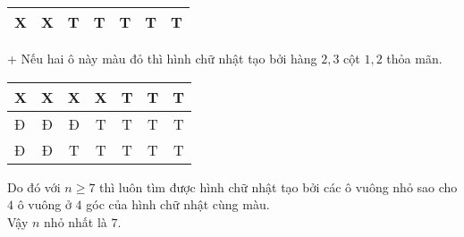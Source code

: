 {\begin{itemize}
\begin{center}
\begin{tabular}{|l|c|c|c|c|c|c|}
		\hline 
		\color{blue}X&  \color{blue}X & \color{white}T & \color{white}T & \color{white}T & \color{white}T & \color{white}T\\
		\hline
	\end{tabular}
	\end{center}
	+ Nếu hai ô này màu đỏ thì hình chữ nhật tạo bởi hàng $2, 3$ cột $1, 2$ thỏa mãn.
	\begin{center}
		\begin{tabular}{|l|c|c|c|c|c|c|}
		\hline 
		\color{blue}X& \color{blue}X & \color{blue}X & \color{blue}X & \color{white}T & \color{white}T & \color{white}T \\ 
		\hline 
		\color{red}Đ & 	\color{red}Đ & 	\color{red}Đ & \color{white}T & \color{white}T & \color{white}T & \color{white}T\\ 
		\hline 
		\color{red}Đ&  \color{red}Đ & \color{white}T & \color{white}T & \color{white}T & \color{white}T & \color{white}T\\
		\hline	
	\end{tabular}
	\end{center}
	\end{itemize}
	Do đó với $n \geq 7$ thì luôn tìm được hình chữ nhật tạo bởi các ô vuông nhỏ sao cho $4$ ô vuông ở $4$ góc của hình chữ nhật cùng màu.\\
	Vậy $n$ nhỏ nhất là $7$.
	
}

 

